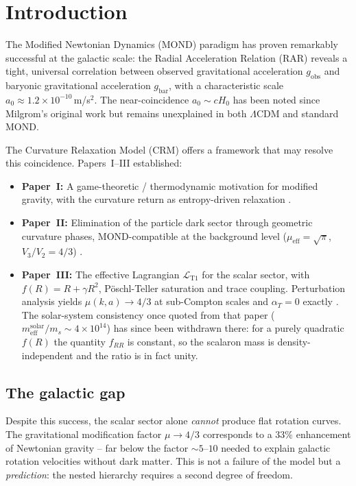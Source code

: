 \documentclass[aps,prd,twocolumn,superscriptaddress,nofootinbib]{revtex4-2}
\begin{document}
\section{Introduction}
\label{sec:intro}

The Modified Newtonian Dynamics (MOND) paradigm \cite{Milgrom1983} has proven remarkably successful at the galactic scale: the Radial Acceleration Relation (RAR) \cite{McGaugh2016} reveals a tight, universal correlation between observed gravitational acceleration $g_{\mathrm{obs}}$ and baryonic gravitational acceleration $g_{\mathrm{bar}}$, with a characteristic scale $a_0 \approx 1.2 \times 10^{-10}$\,m/s$^2$. The near-coincidence $a_0 \sim cH_0$ has been noted since Milgrom's original work but remains unexplained in both $\Lambda$CDM and standard MOND.

The Curvature Relaxation Model (CRM) offers a framework that may resolve this coincidence. Papers~I--III \cite{Geiger2026,Geiger2026b,Geiger2026c} established:
\begin{itemize}
\item \textbf{Paper~I:} A game-theoretic / thermodynamic motivation for modified gravity, with the curvature return as entropy-driven relaxation \cite{Geiger2026}.
\item \textbf{Paper~II:} Elimination of the particle dark sector through geometric curvature phases, MOND-compatible at the background level ($\mu_{\mathrm{eff}} = \sqrt{\pi}$, $V_3/V_2 = 4/3$) \cite{Geiger2026b}.
\item \textbf{Paper~III:} The effective Lagrangian $\mathcal{L}_{\mathrm{T1}}$ for the scalar sector, with $f(R) = R + \gamma R^2$, P\"oschl-Teller saturation and trace coupling. Perturbation analysis yields $\mu(k,a) \to 4/3$ at sub-Compton scales and $\alpha_T = 0$ exactly \cite{Geiger2026c}. The solar-system consistency once quoted from that paper ($m_{\mathrm{eff}}^{\mathrm{solar}}/m_s \sim 4 \times 10^{14}$) has since been withdrawn there: for a purely quadratic $f(R)$ the quantity $f_{RR}$ is constant, so the scalaron mass is density-independent and the ratio is in fact unity.
\end{itemize}

\subsection{The galactic gap}

Despite this success, the scalar sector alone \textit{cannot} produce flat rotation curves. The gravitational modification factor $\mu \to 4/3$ corresponds to a $33\%$ enhancement of Newtonian gravity -- far below the factor $\sim 5$--$10$ needed to explain galactic rotation velocities without dark matter. This is not a failure of the model but a \textit{prediction}: the nested hierarchy requires a second degree of freedom.
\end{document}
